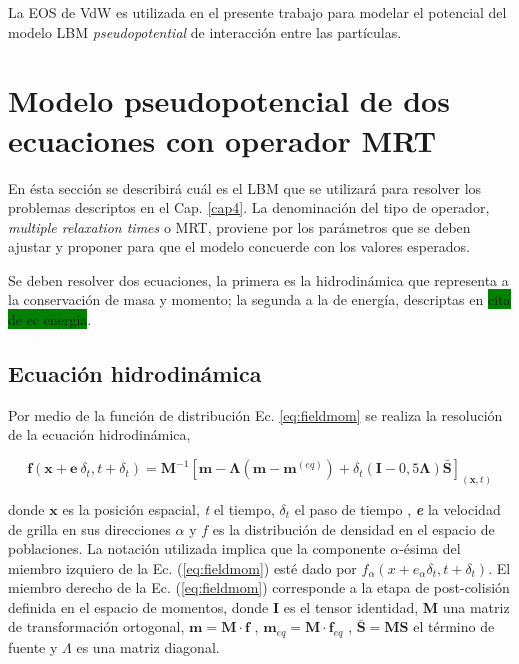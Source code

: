 La EOS de VdW es utilizada en el presente trabajo para modelar el potencial del modelo LBM \textit{pseudopotential} de interacción entre las partículas.


\section{Modelo pseudopotencial de dos ecuaciones con operador MRT}
\label{sec:LBM_2_ec_MRT}

En ésta sección se describirá cuál es el LBM que se utilizará para resolver los problemas descriptos en el Cap. \ref{cap4}. La denominación del tipo de operador, \textit{multiple relaxation times} o MRT, proviene por los parámetros que se deben ajustar y proponer para que el modelo concuerde con los valores esperados.

Se deben resolver dos ecuaciones, la primera es la hidrodinámica que representa a la conservación de masa y momento; la segunda a la de energía, descriptas en \colorbox{green}{cita de ec energia}.


\subsection{Ecuación hidrodinámica}

Por medio de la función de distribución Ec. \ref{eq:fieldmom} \cite{li2013lattice} se realiza la resolución de la ecuación hidrodinámica,


\begin{equation}
    \mathbf{f}(\mathbf{x} + \mathbf{e} \> \delta_{t} , t + \delta_{t}) = \mathbf{M}^{-1} \left[ \mathbf{m} - \mathbf{\Lambda}(\mathbf{m} - \mathbf{m}^{(eq)}) + \delta_{t} \left( \mathbf{I} - 0,5 \mathbf{\Lambda} \right) \mathbf{\bar{S}}  \right]_{(\mathbf{x},t)} 
    \label{eq:fieldmom}
\end{equation}

donde $\mathbf{x}$ es la posición espacial, \textit{t} el tiempo, $\delta_{t}$ el paso de tiempo , \textit{\textbf{e}} la velocidad de grilla en sus direcciones $\alpha$ y $\textit{f}$ es la distribución de densidad en el espacio de poblaciones. La notación utilizada implica que la componente $\alpha$-ésima del miembro izquiero de la Ec. (\ref{eq:fieldmom}) esté dado por $f_{\alpha}(x + e_{\alpha} \delta_{t}  , t + \delta_{t} )$. El miembro derecho de la Ec. (\ref{eq:fieldmom}) corresponde a la etapa de post-colisión definida en el espacio de momentos, donde \textbf{I} es el tensor identidad, \textbf{M} una matriz de transformación ortogonal, $\mathbf{m} = \mathbf{M} \cdot \mathbf{f}$ , $\mathbf{m}_{eq} = \mathbf{M} \cdot \mathbf{f}_{eq}$ , $\mathbf{\bar{S}} = \mathbf{M} \mathbf{S}$ el término de fuente y $ \Lambda$ es una matriz diagonal.


